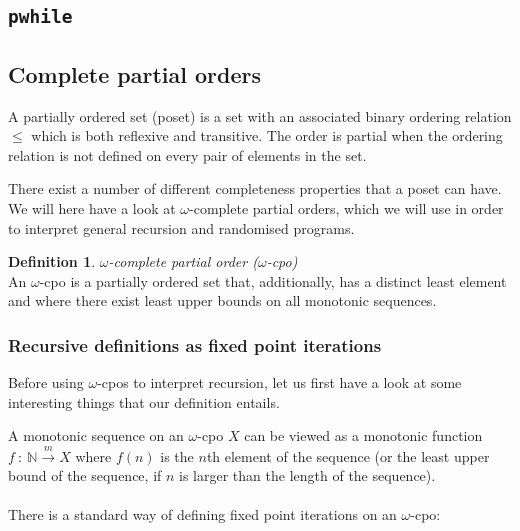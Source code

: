 \documentclass[11pt, leqno]{article}
\theoremstyle{definition}
\newtheorem{defn}[thm]{Definition}
\begin{document}
\subsection{\texttt{pwhile}}

\subsection{Complete partial orders}

A partially ordered set (poset) is a set with an associated binary ordering relation
$\leq$ which is both reflexive and transitive. The order is partial when the ordering
relation is not defined on every pair of elements in the set.

There exist a number of different completeness properties that a poset can have.
We will here have a look at $\omega$-complete partial orders, which we will use in
order to interpret general recursion and randomised programs. 

\begin{defn}
  \textit{$\omega$-complete partial order ($\omega$-cpo)}\\
  An $\omega$-cpo is a partially ordered set that, additionally, has a distinct least
  element and where there exist least upper bounds on all monotonic sequences. 
\end{defn}


\subsubsection{Recursive definitions as fixed point iterations}

Before using $\omega$-cpos to interpret recursion, let us first have a look at some
interesting things that our definition entails.

A monotonic sequence on an $\omega$-cpo $X$ can be viewed as a monotonic function
$f~:~\mathbb{N} \xrightarrow{m} X$ where $f(n)$ is the $n$th element of the sequence (or the
least upper bound of the sequence, if $n$ is larger than the length of the
sequence).\\
\\
There is a standard way of defining fixed point iterations on an $\omega$-cpo: %
\end{document}
